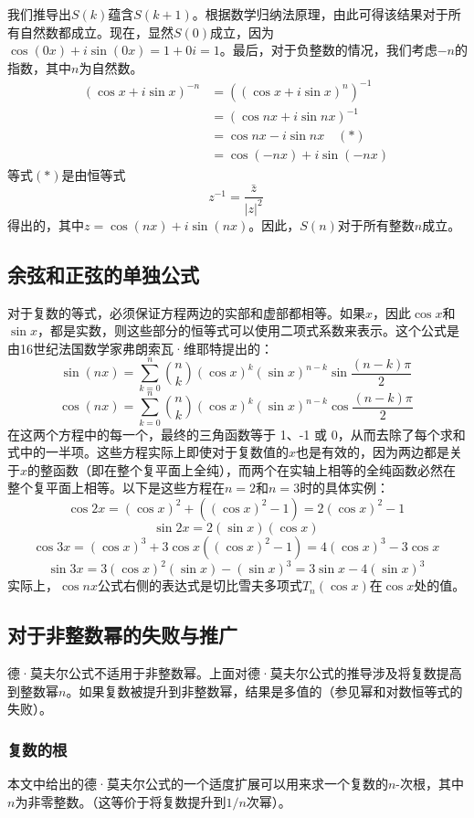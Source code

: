 我们推导出\( S(k) \)蕴含\( S(k+1) \)。根据数学归纳法原理，由此可得该结果对于所有自然数都成立。现在，显然\(S(0)\)成立，因为\( \cos(0x) + i \sin(0x) = 1 + 0i = 1 \)。最后，对于负整数的情况，我们考虑\( -n \)的指数，其中\( n \)为自然数。
\begin{equation}
\begin{aligned}
(\cos x + i \sin x)^{-n}
&= \left( (\cos x + i \sin x)^n \right)^{-1}\\
&= (\cos nx + i \sin nx)^{-1} \\
&= \cos nx - i \sin nx \quad (\ast)\\
&= \cos(-nx) + i \sin(-nx)
\end{aligned}~
\end{equation}
等式\( (\ast) \)是由恒等式
\[
z^{-1} = \frac{\bar{z}}{|z|^2}~
\]
得出的，其中\( z = \cos(nx) + i \sin(nx) \)。因此，\( S(n) \)对于所有整数\( n \)成立。
\subsection{余弦和正弦的单独公式}  
对于复数的等式，必须保证方程两边的实部和虚部都相等。如果\( x \)，因此\( \cos x \)和\( \sin x \)，都是实数，则这些部分的恒等式可以使用二项式系数来表示。这个公式是由16世纪法国数学家弗朗索瓦·维耶特提出的：
\[
\sin(nx) = \sum_{k=0}^{n} \binom{n}{k} (\cos x)^k (\sin x)^{n-k} \sin\frac{(n-k)\pi}{2}~
\]
\[
\cos(nx) = \sum_{k=0}^{n} \binom{n}{k} (\cos x)^k (\sin x)^{n-k} \cos \frac{(n-k)\pi}{2} ~
\]
在这两个方程中的每一个，最终的三角函数等于 1、-1 或 0，从而去除了每个求和式中的一半项。这些方程实际上即使对于复数值的\( x \)也是有效的，因为两边都是关于\( x \)的整函数（即在整个复平面上全纯），而两个在实轴上相等的全纯函数必然在整个复平面上相等。以下是这些方程在\( n = 2 \)和\( n = 3 \)时的具体实例：
\[
\cos 2x = (\cos x)^2 + \left( (\cos x)^2 - 1 \right) = 2(\cos x)^2 - 1~
\]
\[
\sin 2x = 2(\sin x)(\cos x)~
\]
\[
\cos 3x = (\cos x)^3 + 3\cos x \left( (\cos x)^2 - 1 \right) = 4(\cos x)^3 - 3\cos x~
\]
\[
\sin 3x = 3(\cos x)^2(\sin x) - (\sin x)^3 = 3\sin x - 4(\sin x)^3~
\]
实际上，\( \cos nx \)公式右侧的表达式是切比雪夫多项式\( T_n(\cos x) \)在\( \cos x \)处的值。
\subsection{对于非整数幂的失败与推广}  
德·莫夫尔公式不适用于非整数幂。上面对德·莫夫尔公式的推导涉及将复数提高到整数幂\( n \)。如果复数被提升到非整数幂，结果是多值的（参见幂和对数恒等式的失败）。
\subsubsection{复数的根}  
本文中给出的德·莫夫尔公式的一个适度扩展可以用来求一个复数的\(n\)-次根，其中\( n \)为非零整数。（这等价于将复数提升到\(1/n\)次幂）。

